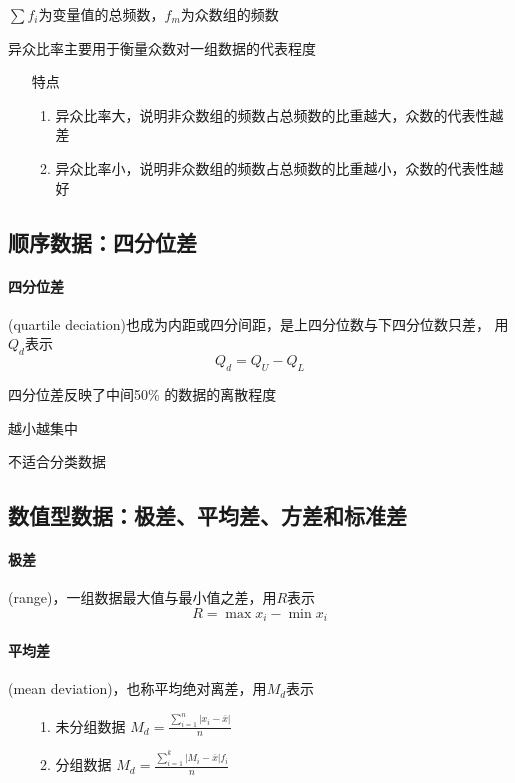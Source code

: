 \documentclass[UTF8,10pt]{book}
\begin{document}
                $\sum f_i $为变量值的总频数，$f_m$为众数组的频数

                {\kaishu 异众比率主要用于衡量众数对一组数据的代表程度}
                    \begin{itemize}
                        \item [特点] {
                            \begin{enumerate}
                                \item 异众比率大，说明非众数组的频数占总频数的比重越大，众数的代表性越差
                                \item 异众比率小，说明非众数组的频数占总频数的比重越小，众数的代表性越好
                            \end{enumerate}
                        }
                    \end{itemize}

        \subsection{顺序数据：四分位差}
                \paragraph{四分位差} (quartile deciation)也成为内距或四分间距，是上四分位数与下四分位数只差，
                用$Q_d$表示
                $$ Q_d = Q_U - Q_L $$

                {\kaishu 四分位差反映了中间50\% 的数据的离散程度}

                {\kaishu 越小越集中}

                {\kaishu 不适合分类数据}

        \subsection{数值型数据：极差、平均差、方差和标准差}
                \paragraph{极差} (range)，一组数据最大值与最小值之差，用$R$表示
                $$ R = \max{x_i} - \min{x_i} $$

                \paragraph{平均差} (mean deviation)，也称平均绝对离差，用$M_d$表示
                \begin{itemize}
                    \item [] {
                        \begin{enumerate}
                            \item 未分组数据 $ M_d = \frac{\sum_{i=1}^n \left| x_i - \overline{x} \right|}{n} $
                            \item 分组数据 $ M_d = \frac{\sum_{i=1}^k \left| M_i - \overline{x} \right| f_i}{n} $
                        
                        \end{enumerate}
                    }
                \end{itemize}
                
\end{document}
